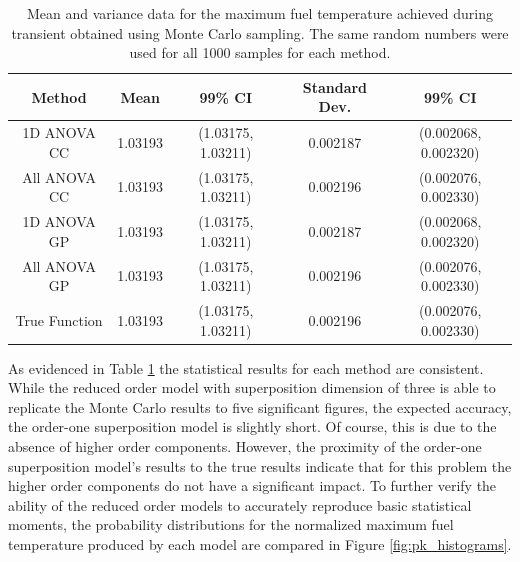 \begin{table}[!htb] 
\caption[Mean and variance data for maximum fuel temperature achieved during transient.]{\label{table:pk_mean_variance} 
Mean and variance data for the maximum fuel temperature achieved during transient obtained using Monte Carlo sampling. The same random numbers were used for all 1000 samples for each method.}
\centering
\small
\begin{tabular}{||c|c|c|c|c||} 
\hline \hline
\textbf{Method} & \textbf{Mean} & \textbf{99\% CI} & \textbf{Standard Dev.} & \textbf{99\% CI} \\ \hline
1D ANOVA CC  & 1.03193 & (1.03175, 1.03211) & 0.002187 & (0.002068, 0.002320) \\ \hline
All ANOVA CC & 1.03193 & (1.03175, 1.03211) & 0.002196 & (0.002076, 0.002330) \\ \hline
1D ANOVA GP  & 1.03193 & (1.03175, 1.03211) & 0.002187 & (0.002068, 0.002320) \\ \hline
All ANOVA GP & 1.03193 & (1.03175, 1.03211) & 0.002196 & (0.002076, 0.002330) \\ \hline
True Function & 1.03193 & (1.03175, 1.03211) & 0.002196 & (0.002076, 0.002330) \\ 
\hline \hline
\end{tabular}
\end{table}
As evidenced in Table \ref{table:pk_mean_variance} the statistical results for each method are consistent. While the reduced order model with superposition dimension of three is able to replicate the Monte Carlo results to five significant figures, the expected accuracy, the order-one superposition model is slightly short. Of course, this is due to the absence of higher order components. However, the proximity of the order-one superposition model's results to the true results indicate that for this problem the higher order components do not have a significant impact. To further verify the ability of the reduced order models to accurately reproduce basic statistical moments, the probability distributions for the normalized maximum fuel temperature produced by each model are compared in Figure \ref{fig:pk_histograms}. 
